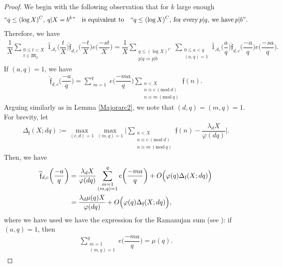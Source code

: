 \documentclass[12pt]{amsart}
\numberwithin{equation}{section}
\theoremstyle{remark}
\theoremstyle{definition}
\newcommand{\imod}[1]{\ (\mathrm{mod}\ #1)}
\begin{document}
\begin{proof} We begin with the following observation that for $k$ large enough
\[``q\leq (\log X)^C,\: q|X=b^k" \quad \text{is equivalent to} \quad ``q\leq (\log X)^C,\: \text{for every}\: p|q, \: \text{we have} \: p|b".\]
Therefore, we have
\begin{align}
\label{Maintermeq0}\dfrac{1}{X}\sum_{\substack{0\leq t<X\\t\in \mathfrak{M}_3}}\widehat{1}_{\mathcal{A}_r}\bigg(\dfrac{t}{X}\bigg)\widehat{\mathfrak{f}}_{d, c}\bigg(\dfrac{-t}{X}\bigg)e\bigg(\dfrac{-st}{X}\bigg)=\dfrac{1}{X}\sum_{\substack{q \leq (\log X)^C\\p|q\Rightarrow p|b}}\sum_{\substack{0\leq a<q\\(a,q)=1}}\widehat{1}_{\mathcal{A}_r}\bigg(\dfrac{a}{q}\bigg)\widehat{\mathfrak{f}}_{d,c}\bigg(\dfrac{-a}{q}\bigg)e\bigg(\dfrac{-sa}{q}\bigg).
\end{align}
If $(a, q)=1$, we have
\begin{align}
\label{Maintermeq00} \widehat{\mathfrak{f}}_{d, c}\bigg(\dfrac{-a}{q}\bigg)=\sum_{\substack{m=1}}^q e\bigg(\dfrac{-ma}{q}\bigg)\sum_{\substack{n<X\\n\equiv c\imod{d}\\ n\equiv m\imod q}}\mathfrak{f}(n).
\end{align}
Arguing similarly as in Lemma \ref{Majorarc2}, we note that $(d, q)=(m, q)=1$. For brevity, let
\begin{align}
\Delta_{\mathfrak{f}}(X; dq):=\max_{(c, d)=1}\max_{(m, q )=1}\Bigg\lvert\sum_{\substack{n<X\\n\equiv c\imod d\\n\equiv m\imod q}}\mathfrak{f}(n)-\dfrac{ \lambda_{d} X}{\varphi(dq)}\Bigg\rvert.
\end{align}
Then, we have
\begin{align}
\notag  \widehat{\mathfrak{f}}_{d, c}\bigg(\dfrac{-a}{q}\bigg) &=\dfrac{\lambda_{d} X}{\varphi(dq)}\sum_{\substack{m=1\\(m,q)=1}}^q e\bigg(\dfrac{-ma}{q}\bigg)+O\Big(\varphi(q)\Delta_{\mathfrak{f}}(X;dq)\Big)\\
\label{maintermeq1} &=\dfrac{ \lambda_{d}\mu(q) X}{\varphi(dq)}+O\Big(\varphi(q)\Delta_{\mathfrak{f}}(X;dq)\Big),
\end{align}
where we have used we have the expression for the Ramanujan sum (see \cite[p. 149]{dav}): if $(a, q)=1$, then
\begin{align}
\label{Ramanujan}\sum_{\substack{m=1\\(m,q)=1}}^q e\bigg(\dfrac{-ma}{q}\bigg)=\mu(q).
\end{align}


\end{proof}
\end{document}
